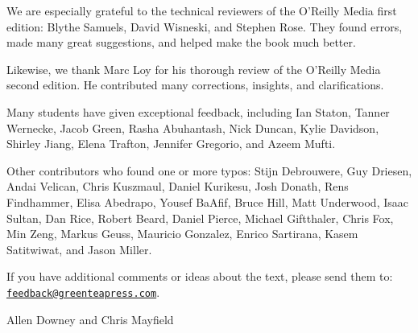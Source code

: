 We are especially grateful to the technical reviewers of the O'Reilly Media first edition: Blythe Samuels, David Wisneski, and Stephen Rose.
They found errors, made many great suggestions, and helped make the book much better.

Likewise, we thank Marc Loy for his thorough review of the O'Reilly Media second edition.
He contributed many corrections, insights, and clarifications.

Many students have given exceptional feedback, including Ian Staton, Tanner Wernecke, Jacob Green, Rasha Abuhantash, Nick Duncan, Kylie Davidson, Shirley Jiang, Elena Trafton, Jennifer Gregorio, and Azeem Mufti.

Other contributors who found one or more typos: Stijn Debrouwere, Guy Driesen, Andai Velican, Chris Kuszmaul, Daniel Kurikesu, Josh Donath, Rens Findhammer, Elisa Abedrapo, Yousef BaAfif, Bruce Hill, Matt Underwood, Isaac Sultan, Dan Rice, Robert Beard, Daniel Pierce, Michael Giftthaler, Chris Fox, Min Zeng, Markus Geuss, Mauricio Gonzalez, Enrico Sartirana, Kasem Satitwiwat, and Jason Miller.


If you have additional comments or ideas about the text, please send them to: \href{mailto:feedback@greenteapress.com}{\tt feedback@greenteapress.com}.

\hfill Allen Downey and Chris Mayfield
